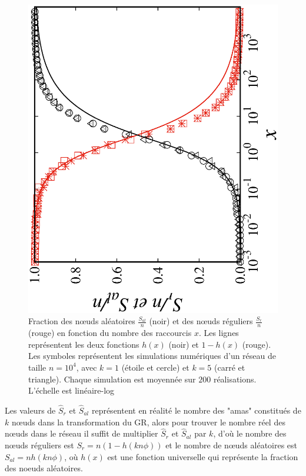 \begin{figure}[h!]
	\centering
	\includegraphics[scale=0.5,angle=-90]{./figures/fig-s}
	\caption{Fraction des nœuds aléatoires $\frac{S_{al}}{n}$ (noir) et des nœuds réguliers $\frac{S_{r}}{n}$ (rouge)  en fonction du nombre des raccourcis $x$. Les lignes représentent les deux fonctions $h(x)$  (noir) et $1-h(x)$ (rouge). Les symboles représentent les simulations numériques d'un réseau de taille $n=10^4$, avec $k=1$ (étoile et cercle) et $k=5$ (carré et triangle). Chaque simulation est moyennée sur $200$ réalisations. L'échelle est linéaire-log}
	\label{S}
\end{figure}
Les valeurs de $\hat{S}_{r}$ et $\hat{S}_{al}$ représentent en réalité le nombre des "\textsf{\textsf{amas}}" constitués de $k$ nœuds dans la transformation du GR,
alors pour trouver le nombre réel des nœuds dans le réseau il suffit de multiplier $\hat{S}_{r}$ et $\hat{S}_{al}$  par $k$,  d'où le nombre des nœuds réguliers est $S_r=n(1-h(kn\phi))$ et le nombre de nœuds aléatoires est $S_{al}=n h(kn\phi)$, où $h(x)$ est une fonction universelle qui représente la fraction des noeuds aléatoires.
